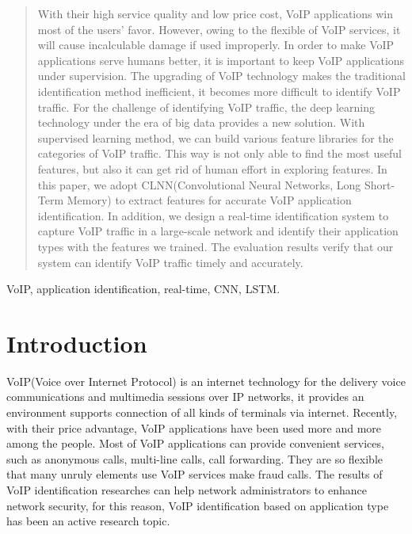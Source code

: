 \documentclass[conference]{IEEEtran}
\begin{document}
\begin{abstract}
  With their high service quality and low price cost, VoIP applications win most of the users' favor. However, owing to the flexible of VoIP services, it will cause incalculable damage if used improperly. In order to make VoIP applications serve humans better, it is important to keep VoIP applications under supervision. The upgrading of VoIP technology makes the traditional identification method inefficient, it becomes more difficult to identify VoIP traffic. For the challenge of identifying VoIP traffic, the deep learning technology under the era of big data provides a new solution. With supervised learning method, we can build various feature libraries for the categories of VoIP traffic. This way is not only able to find the most useful features, but also it can get rid of human effort in exploring features. In this paper, we adopt CLNN(Convolutional Neural Networks, Long Short-Term Memory) to extract features for accurate VoIP application identification. In addition, we design a real-time identification system to capture VoIP traffic in a large-scale network and identify their application types with the features we trained. The evaluation results verify that our system can identify VoIP traffic timely and accurately.

\end{abstract}

\begin{IEEEkeywords}
VoIP, application identification, real-time, CNN, LSTM.
\end{IEEEkeywords}

\section{Introduction}
\label{intro}
VoIP(Voice over Internet Protocol) is an internet technology for the delivery voice communications and multimedia sessions over IP networks, it provides an environment supports connection of all kinds of terminals via internet. Recently, with their price advantage, VoIP applications have been used more and more among the people. Most of VoIP applications can provide convenient services, such as anonymous calls, multi-line calls, call forwarding. They are so flexible that many unruly elements use VoIP services make fraud calls. The results of VoIP identification researches can help network administrators to enhance network security, for this reason, VoIP identification based on application type has been an active research topic.
\end{document}
